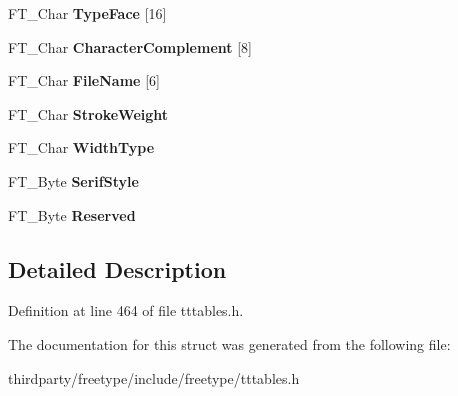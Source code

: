 \begin{DoxyCompactItemize}
F\+T\+\_\+\+Char {\bfseries Type\+Face} \mbox{[}16\mbox{]}
\item 
\mbox{\label{struct_t_t___p_c_l_t___a2641686beb550bcf8d9e598336f0acd9}} 
F\+T\+\_\+\+Char {\bfseries Character\+Complement} \mbox{[}8\mbox{]}
\item 
\mbox{\label{struct_t_t___p_c_l_t___a87691bde7cb06e3043f5320c8223e768}} 
F\+T\+\_\+\+Char {\bfseries File\+Name} \mbox{[}6\mbox{]}
\item 
\mbox{\label{struct_t_t___p_c_l_t___aaf28b05ac07bcdc1ae6f4ec9064434fc}} 
F\+T\+\_\+\+Char {\bfseries Stroke\+Weight}
\item 
\mbox{\label{struct_t_t___p_c_l_t___ad6613ad7556599343f999a7d27a0f1d0}} 
F\+T\+\_\+\+Char {\bfseries Width\+Type}
\item 
\mbox{\label{struct_t_t___p_c_l_t___aa8e3d35937660a1e4959ee10a4800e6a}} 
F\+T\+\_\+\+Byte {\bfseries Serif\+Style}
\item 
\mbox{\label{struct_t_t___p_c_l_t___a2e46e3f5eaa51e02d831d3f6143f8846}} 
F\+T\+\_\+\+Byte {\bfseries Reserved}
\end{DoxyCompactItemize}


\subsection{Detailed Description}


Definition at line 464 of file tttables.\+h.



The documentation for this struct was generated from the following file\+:\begin{DoxyCompactItemize}
\item 
thirdparty/freetype/include/freetype/tttables.\+h\end{DoxyCompactItemize}

